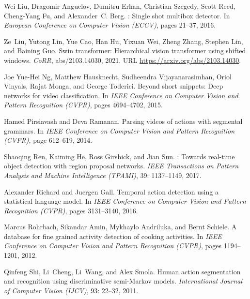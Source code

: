 \documentclass{bmvc2k}
\begin{document}
\begin{thebibliography}{53}
Wei Liu, Dragomir Anguelov, Dumitru Erhan, Christian Szegedy, Scott Reed,
  Cheng-Yang Fu, and Alexander~C. Berg.
: Single shot multibox detector.
\newblock In \emph{European Conference on Computer Vision (ECCV)}, pages
  21--37, 2016.

Ze~Liu, Yutong Lin, Yue Cao, Han Hu, Yixuan Wei, Zheng Zhang, Stephen Lin, and
  Baining Guo.
\newblock Swin transformer: Hierarchical vision transformer using shifted
  windows.
\newblock \emph{CoRR}, abs/2103.14030, 2021.
\newblock URL \url{https://arxiv.org/abs/2103.14030}.

Joe Yue-Hei Ng, Matthew Hausknecht, Sudheendra Vijayanarasimhan, Oriol Vinyals,
  Rajat Monga, and George Toderici.
\newblock Beyond short snippets: Deep networks for video classification.
\newblock In \emph{{IEEE} Conference on Computer Vision and Pattern Recognition
  (CVPR)}, pages 4694--4702, 2015.

Hamed Pirsiavash and Deva Ramanan.
\newblock Parsing videos of actions with segmental grammars.
\newblock In \emph{{IEEE} Conference on Computer Vision and Pattern Recognition
  (CVPR)}, page 612–619, 2014.

Shaoqing Ren, Kaiming He, Ross Girshick, and Jian Sun.
: Towards real-time object detection with region
  proposal networks.
\newblock \emph{IEEE Transactions on Pattern Analysis and Machine Intelligence
  (TPAMI)}, 39: 1137--1149, 2017.

Alexander Richard and Juergen Gall.
\newblock Temporal action detection using a statistical language model.
\newblock In \emph{{IEEE} Conference on Computer Vision and Pattern Recognition
  (CVPR)}, pages 3131--3140, 2016.

Marcus Rohrbach, Sikandar Amin, Mykhaylo Andriluka, and Bernt Schiele.
\newblock A database for fine grained activity detection of cooking activities.
\newblock In \emph{IEEE Conference on Computer Vision and Pattern Recognition
  (CVPR)}, pages 1194--1201, 2012.

Qinfeng Shi, Li~Cheng, Li~Wang, and Alex Smola.
\newblock Human action segmentation and recognition using discriminative
  semi-{Markov} models.
\newblock \emph{International Journal of Computer Vision (IJCV)}, 93:
  22--32, 2011.


\end{thebibliography}
\end{document}
